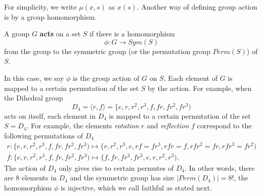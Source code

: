 \documentclass[../main.tex]{subfiles}
\begin{document}
For simplicity, we write $\mu(x,s)$ as $x(s)$. Another way of defining group action is by a group homomorphism.

\begin{definition}
A group $G$ \textbf{acts} on a set $S$ if there is a homomorphism 
\begin{equation*}
    \phi:G \rightarrow Sym(S)
\end{equation*}
from the group to the symmetric group (or the permutation group $Perm(S)$) of $S$. 
\end{definition}

In this case, we say $\phi$ is the group action of $G$ on $S$. Each element of $G$ is mapped to a certain permutation of the set $S$ by the action. For example, when the Dihedral group
\begin{equation*}
    D_4=\langle r,f\rangle=\{e,r,r^2,r^3,f,fr,fr^2,fr^3)
\end{equation*}
acts on itself, 
each element in $D_4$ is mapped to a certain permutation of the set $S=D_4$. For example, the elements \textit{rotation} $r$ and \textit{reflection} $f$ correspond to the following permutations of $D_4$
\begin{align*}
    r: \{e,r,r^2,r^3,f,fr,fr^2,fr^3) \mapsto \{r,r^2,r^3,e, rf=fr^3,rfr=f,rfr^2=fr, rfr^3=fr^2) \\
    f: \{e,r,r^2,r^3,f,fr,fr^2,fr^3) \mapsto \{f,fr,fr^2,fr^3,e,r,r^2,r^3).
\end{align*}
The action of $D_4$ only gives rise to certain permutes of $D_4$. In other words, there are 8 elements in $D_4$ and the symmetric group has size $|Perm(D_4)|=8!$, the homomorphism $\phi$ is injective, which we call faithful as stated next. 
\end{document}
